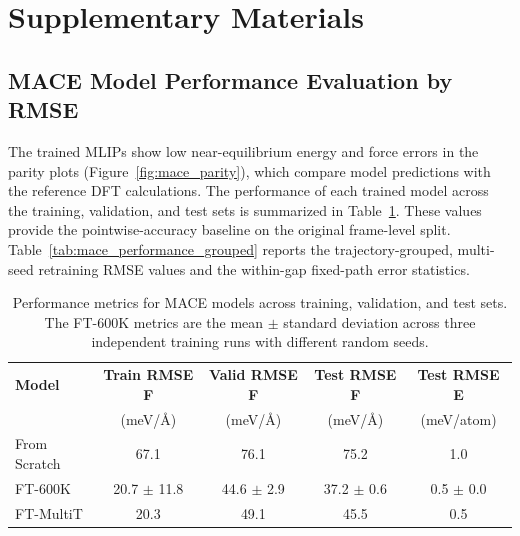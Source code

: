 \documentclass[pdflatex,sn-mathphys-num]{sn-jnl}%
\theoremstyle{thmstyleone}%
\theoremstyle{thmstyletwo}%
\theoremstyle{thmstylethree}%
\begin{document}
\section{Supplementary Materials}
\subsection{MACE Model Performance Evaluation by RMSE}

The trained MLIPs show low near-equilibrium energy and force errors in the parity plots (Figure~\ref{fig:mace_parity}), which compare model predictions with the reference DFT calculations. The performance of each trained model across the training, validation, and test sets is summarized in Table~\ref{tab:mace_performance_detailed}. These values provide the pointwise-accuracy baseline on the original frame-level split. Table~\ref{tab:mace_performance_grouped} reports the trajectory-grouped, multi-seed retraining RMSE values and the within-gap fixed-path error statistics.

\begin{table}[htbp]
    \centering
    \scriptsize
    \setlength{\tabcolsep}{2pt}
    \caption{Performance metrics for MACE models across training, validation, and test sets. The FT-600K metrics are the mean $\pm$ standard deviation across three independent training runs with different random seeds.}
    \label{tab:mace_performance_detailed}
    \begin{tabular}{lcccc}
        \toprule
        \textbf{Model} & \textbf{Train RMSE F} & \textbf{Valid RMSE F} & \textbf{Test RMSE F} & \textbf{Test RMSE E} \\
         & (meV/\AA) & (meV/\AA) & (meV/\AA) & (meV/atom) \\
        \midrule
        From Scratch & 67.1 & 76.1 & 75.2 & 1.0 \\
        FT-600K & 20.7 $\pm$ 11.8 & 44.6 $\pm$ 2.9 & 37.2 $\pm$ 0.6 & 0.5 $\pm$ 0.0 \\
        FT-MultiT & 20.3 & 49.1 & 45.5 & 0.5 \\
        \bottomrule
    \end{tabular}
\end{table}
\end{document}
